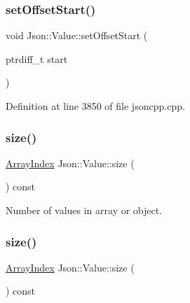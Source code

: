 \hypertarget{class_json_1_1_value_a92e32ea0f4f8a15853a3cf0beac9feb9}{}\label{class_json_1_1_value_a92e32ea0f4f8a15853a3cf0beac9feb9} 
\subsubsection{\texorpdfstring{set\+Offset\+Start()}{setOffsetStart()}\hspace{0.1cm}{\footnotesize\ttfamily [2/2]}}
{\footnotesize\ttfamily void Json\+::\+Value\+::set\+Offset\+Start (\begin{DoxyParamCaption}\item[{ptrdiff\+\_\+t}]{start }\end{DoxyParamCaption})}



Definition at line 3850 of file jsoncpp.\+cpp.

\hypertarget{class_json_1_1_value_a0ec2808e1d7efa4e9fad938d6667be44}{}\label{class_json_1_1_value_a0ec2808e1d7efa4e9fad938d6667be44} 
\subsubsection{\texorpdfstring{size()}{size()}\hspace{0.1cm}{\footnotesize\ttfamily [1/2]}}
{\footnotesize\ttfamily \hyperlink{class_json_1_1_value_a184a91566cccca7b819240f0d5561c7d}{Array\+Index} Json\+::\+Value\+::size (\begin{DoxyParamCaption}{ }\end{DoxyParamCaption}) const}



Number of values in array or object. 

\hypertarget{class_json_1_1_value_a0ec2808e1d7efa4e9fad938d6667be44}{}\label{class_json_1_1_value_a0ec2808e1d7efa4e9fad938d6667be44} 
\subsubsection{\texorpdfstring{size()}{size()}\hspace{0.1cm}{\footnotesize\ttfamily [2/2]}}
{\footnotesize\ttfamily \hyperlink{class_json_1_1_value_a184a91566cccca7b819240f0d5561c7d}{Array\+Index} Json\+::\+Value\+::size (\begin{DoxyParamCaption}{ }\end{DoxyParamCaption}) const}



